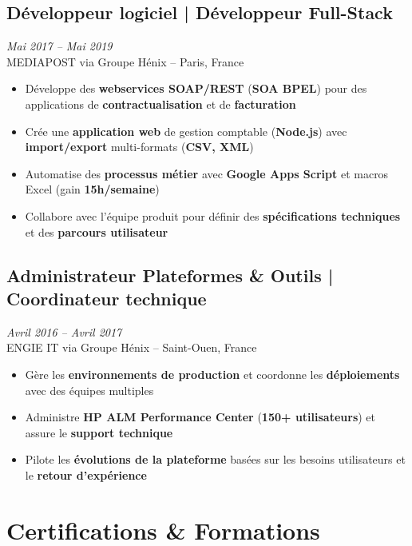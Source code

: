 \documentclass[11pt,a4paper]{article}
\newcommand{\highlight}[1]{\textcolor{primaryblue}{\textbf{#1}}}
\newcommand{\keypoint}[1]{\textbf{#1}}
\begin{document}
\subsection*{Développeur logiciel | Développeur Full-Stack} \hfill \textit{\color{mediumgray}Mai 2017 -- Mai 2019}\\
MEDIAPOST via Groupe Hénix -- Paris, France
\begin{itemize}[leftmargin=22pt]
    \item Développe des \highlight{webservices SOAP/REST} (\highlight{SOA BPEL}) pour des applications de \highlight{contractualisation} et de \highlight{facturation}
    \item Crée une \highlight{application web} de gestion comptable (\highlight{Node.js}) avec \highlight{import/export} multi-formats (\highlight{CSV, XML})
    \item Automatise des \highlight{processus métier} avec \highlight{Google Apps Script} et macros Excel (gain \keypoint{15h/semaine})
    \item Collabore avec l'équipe produit pour définir des \highlight{spécifications techniques} et des \highlight{parcours utilisateur}
\end{itemize}

\subsection*{Administrateur Plateformes \& Outils | Coordinateur technique} \hfill \textit{\color{mediumgray}Avril 2016 -- Avril 2017}\\
ENGIE IT via Groupe Hénix -- Saint-Ouen, France
\begin{itemize}[leftmargin=22pt]
    \item Gère les \highlight{environnements de production} et coordonne les \highlight{déploiements} avec des équipes multiples
    \item Administre \highlight{HP ALM Performance Center} (\keypoint{150+ utilisateurs}) et assure le \highlight{support technique}
    \item Pilote les \highlight{évolutions de la plateforme} basées sur les besoins utilisateurs et le \highlight{retour d'expérience}
\end{itemize}
\vspace{6pt}

\section*{Certifications \& Formations}
\end{document}
